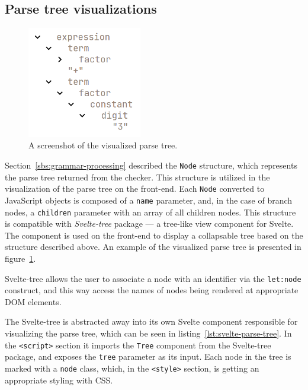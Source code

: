\documentclass[english,engineering]{wizthesis}
\begin{document}
\subsection{Parse tree visualizations}

\begin{figure}
  \centering
  \includegraphics[width=5cm]{parse_tree.png}
  \caption{A screenshot of the visualized parse tree.}
  \label{fig:front-end-parse-tree}
\end{figure}

Section~\ref{sbs:grammar-processing} described the \texttt{Node} structure,
which represents the parse tree returned from the checker. This structure is
utilized in the visualization of the parse tree on the front-end. Each
\texttt{Node} converted to JavaScript objects is composed of a \texttt{name}
parameter, and, in the case of branch nodes, a \texttt{children} parameter with
an array of all children nodes. This structure is compatible with
\emph{Svelte-tree} package --- a tree-like view component for Svelte. The
component is used on the front-end to display a collapsable tree based on the
structure described above. An example of the visualized parse tree is presented
in figure~\ref{fig:front-end-parse-tree}.

Svelte-tree allows the user to associate a node with an identifier via the
\texttt{let:node} construct, and this way access the names of nodes being
rendered at appropriate DOM elements.

The Svelte-tree is abstracted away into its own Svelte component responsible for
visualizing the parse tree, which can be seen in
listing~\ref{lst:svelte-parse-tree}. In the \texttt{<script>} section it imports
the \texttt{Tree} component from the Svelte-tree package, and exposes the
\texttt{tree} parameter as its input. Each node in the tree is marked with a
\texttt{node} class, which, in the \texttt{<style>} section, is getting an
appropriate styling with CSS.
\end{document}
